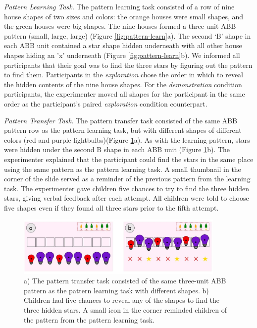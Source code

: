 \textit{Pattern Learning Task.} The pattern learning task consisted of a row of nine house shapes of two sizes and colors: the orange houses were small shapes, and the green houses were big shapes. The nine houses formed a three-unit ABB pattern (small, large, large) (Figure \ref{fig:pattern-learn}a). The second `B’ shape in each ABB unit contained a star shape hidden underneath with all other house shapes hiding an 'x' underneath (Figure \ref{fig:pattern-learn}b). We informed all participants that their goal was to find the three stars by figuring out the pattern to find them. Participants in the \textit{exploration} chose the order in which to reveal the hidden contents of the nine house shapes. For the \textit{demonstration} condition participants, the experimenter moved all shapes for the participant in the same order as the participant’s paired \textit{exploration} condition counterpart. 

\textit{Pattern Transfer Task.} The pattern transfer task consisted of the same ABB pattern row as the pattern learning task, but with different shapes of different colors (red and purple lightbulbs)(Figure \ref{fig:pattern-transfer}a). As with the learning pattern, stars were hidden under the second B shape in each ABB unit (Figure \ref{fig:pattern-transfer}b). The experimenter explained that the participant could find the stars in the same place using the same pattern as the pattern learning task. A small thumbnail in the corner of the slide served as a reminder of the previous pattern from the learning task. The experimenter gave children five chances to try to find the three hidden stars, giving verbal feedback after each attempt. All children were told to choose five shapes even if they found all three stars prior to the fifth attempt.

\begin{figure}
\centering
  \includegraphics[width=0.9\textwidth]{future/figures/pattern_transfer.jpg}
  \caption[The pattern transfer task consisted of the same three-unit ABB pattern as the pattern learning task.]{a) The pattern transfer task consisted of the same three-unit ABB pattern as the pattern learning task with different shapes. b) Children had five chances to reveal any of the shapes to find the three hidden stars. A small icon in the corner reminded children of the pattern from the pattern learning task.
}
  \label{fig:pattern-transfer}
\end{figure}

